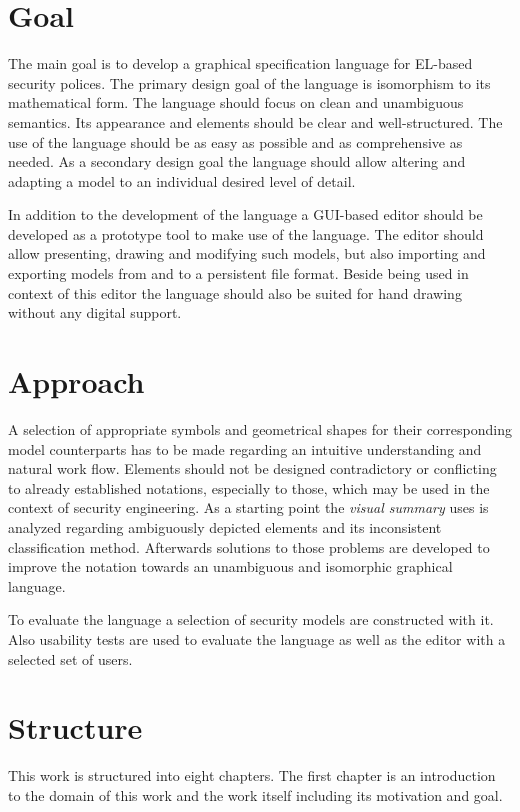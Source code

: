 \documentclass[twoside, openright, 12pt]{book}
\begin{document}
\section{Goal} 
The main goal is to develop a graphical specification language for EL-based security polices.
The primary design goal of the language is isomorphism to its mathematical form.
The language should focus on clean and unambiguous semantics.
Its appearance and elements should be clear and well-structured.
The use of the language should be as easy as possible and as comprehensive as needed.
As a secondary design goal the language should allow altering and adapting a model to an individual desired level of detail.

In addition to the development of the language a GUI-based editor should be developed as a prototype tool to make use of the language.
The editor should allow presenting, drawing and modifying such models, but also importing and exporting models from and to a persistent file format.
Beside being used in context of this editor the language should also be suited for hand drawing without any digital support.


\section{Approach}
\label{approach}
A selection of appropriate symbols and geometrical shapes for their corresponding model counterparts has to be made regarding an intuitive understanding and natural work flow.
Elements should not be designed contradictory or conflicting to already established notations, especially to those, which may be used in the context of security engineering.
As a starting point the \textit{visual summary} \cite*{Amthor18} uses is analyzed regarding ambiguously depicted elements and its inconsistent classification method.
Afterwards solutions to those problems are developed to improve the notation towards an unambiguous and isomorphic graphical language.

To evaluate the language a selection of security models are constructed with it.
Also usability tests are used to evaluate the language as well as the editor with a selected set of users.



\section{Structure}
\label{structure}
This work is structured into eight chapters.
The first chapter is an introduction to the domain of this work and the work itself including its motivation and goal.
\end{document}
